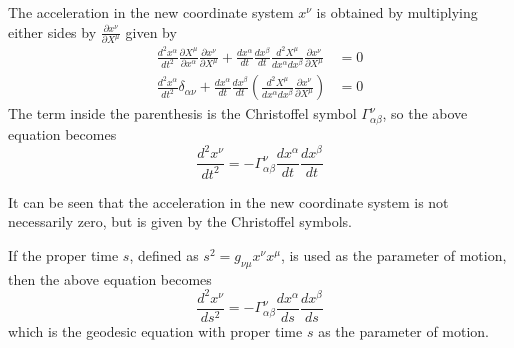 \documentclass[a4paper, 12pt]{article}
\begin{document}
The acceleration in the new coordinate system $x^\nu$ is obtained by multiplying either sides by $\frac{\partial x^{\nu}}{\partial X^{\mu}}$ given by
\begin{align*}
    \frac{d^2x^\alpha}{dt^2} \frac{\partial X^{\mu}}{\partial x^{\alpha}}\frac{\partial x^{\nu}}{\partial X^{\mu}} + \frac{dx^\alpha}{dt}\frac{dx^\beta}{dt} \frac{d^2X^{\mu}}{dx^{\alpha}dx^{\beta}}\frac{\partial x^{\nu}}{\partial X^{\mu}}&=0\\
    \frac{d^2x^\alpha}{dt^2} \delta_{\alpha\nu} + \frac{dx^\alpha}{dt}\frac{dx^\beta}{dt} \left(\frac{d^2X^{\mu}}{dx^{\alpha}dx^{\beta}}\frac{\partial x^{\nu}}{\partial X^{\mu}}\right)&=0
\end{align*}
The term inside the parenthesis is the Christoffel symbol $\Gamma^\nu_{\alpha\beta}$, so the above equation becomes
\begin{equation}
    \frac{d^2x^\nu}{dt^2}=-\Gamma^\nu_{\alpha\beta}\frac{dx^\alpha}{dt}\frac{dx^\beta}{dt}
\end{equation}

It can be seen that the acceleration in the new coordinate system is not necessarily zero, but is given by the Christoffel symbols.

If the proper time $s$, defined as $s^2=g_{\nu\mu}x^\nu x^\mu$, is used as the parameter of motion, then the above equation becomes
\begin{equation}
    \frac{d^2x^\nu}{ds^2}=-\Gamma^\nu_{\alpha\beta}\frac{dx^\alpha}{ds}\frac{dx^\beta}{ds}
\end{equation}
which is the geodesic equation with proper time $s$ as the parameter of motion.



%
%
\end{document}

